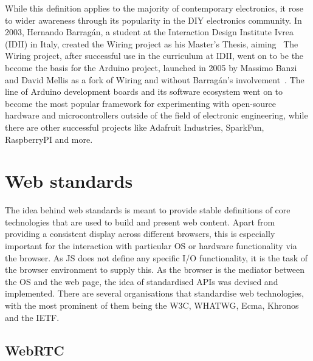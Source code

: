 While this definition applies to the majority of contemporary electronics, it rose to wider awareness through its popularity in the \ac{DIY} electronics community.
In 2003, Hernando Barragán, a student at the Interaction Design Institute Ivrea (IDII) in Italy, created the Wiring project as his Master's Thesis, aiming~ The Wiring project, after successful use in the curriculum at IDII, went on to be the become the basis for the Arduino project, launched in 2005 by Massimo Banzi and David Mellis as a fork of Wiring and without Barragán's involvement~\parencite{arduinoHistory}.
The line of Arduino development boards and its software ecosystem went on to become the most popular framework for experimenting with open-source hardware and microcontrollers outside of the field of electronic engineering, while there are other successful projects like Adafruit Industries, SparkFun, RaspberryPI and more.


\section{Web standards}
\label{sec:webstandards}

The idea behind web standards is meant to provide stable definitions of core technologies that are used to build and present web content.
Apart from providing a consistent display across different browsers, this is especially important for the interaction with particular \ac{OS} or hardware functionality via the browser.
As \ac{JS} does not define any specific \ac{I/O} functionality, it is the task of the browser environment to supply this.
As the browser is the mediator between the \ac{OS} and the web page, the idea of standardised \ac{API}s was devised and implemented.
There are several organisations that standardise web technologies, with the most prominent of them being the \ac{W3C}, \ac{WHATWG}, Ecma, Khronos and the \ac{IETF}.

\subsection{WebRTC}

